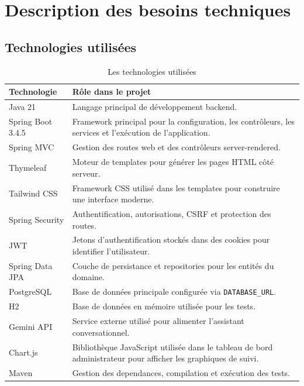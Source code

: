 \documentclass[12pt,a4paper]{report}
\begin{document}
\section{Description des besoins techniques}

\subsection{Technologies utilisées}

\begin{longtable}{|p{4cm}|p{9.6cm}|}
    \caption{Les technologies utilisées}\\
    \hline
    \textbf{Technologie} & \textbf{Rôle dans le projet}\\
    \hline
    Java 21 & Langage principal de développement backend.\\
    \hline
    Spring Boot 3.4.5 & Framework principal pour la configuration, les contrôleurs, les services et l'exécution de l'application.\\
    \hline
    Spring MVC & Gestion des routes web et des contrôleurs server-rendered.\\
    \hline
    Thymeleaf & Moteur de templates pour générer les pages HTML côté serveur.\\
    \hline
    Tailwind CSS & Framework CSS utilisé dans les templates pour construire une interface moderne.\\
    \hline
    Spring Security & Authentification, autorisations, CSRF et protection des routes.\\
    \hline
    JWT & Jetons d'authentification stockés dans des cookies pour identifier l'utilisateur.\\
    \hline
    Spring Data JPA & Couche de persistance et repositories pour les entités du domaine.\\
    \hline
    PostgreSQL & Base de données principale configurée via \texttt{DATABASE\_URL}.\\
    \hline
    H2 & Base de données en mémoire utilisée pour les tests.\\
    \hline
    Gemini API & Service externe utilisé pour alimenter l'assistant conversationnel.\\
    \hline
    Chart.js & Bibliothèque JavaScript utilisée dans le tableau de bord administrateur pour afficher les graphiques de suivi.\\
    \hline
    Maven & Gestion des dependances, compilation et exécution des tests.\\
    \hline
\end{longtable}
\end{document}
